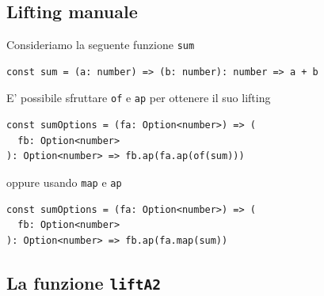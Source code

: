 \documentclass[12pt]{article}
\begin{document}








\subsection{Lifting manuale}

Consideriamo la seguente funzione \texttt{sum}

\begin{verbatim}
const sum = (a: number) => (b: number): number => a + b
\end{verbatim}

E' possibile sfruttare \texttt{of} e \texttt{ap} per ottenere il suo lifting

\begin{verbatim}
const sumOptions = (fa: Option<number>) => (
  fb: Option<number>
): Option<number> => fb.ap(fa.ap(of(sum)))
\end{verbatim}

oppure usando \texttt{map} e \texttt{ap}

\begin{verbatim}
const sumOptions = (fa: Option<number>) => (
  fb: Option<number>
): Option<number> => fb.ap(fa.map(sum))
\end{verbatim}

\subsection{La funzione \texttt{liftA2}}
\end{document}
